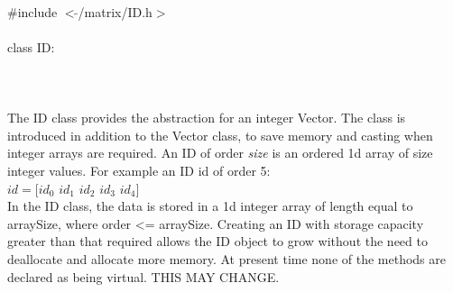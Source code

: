 
   \\
\indent \#include $<\tilde{ }$/matrix/ID.h$>$  \\

  \\
\indent class ID:  \\

 \\
 \\

  \\
\indent The ID class provides the abstraction for an integer Vector. 
The class is introduced in addition to the Vector class, to save memory
and casting when integer arrays are required. An ID of order {\em
size} is an ordered 1d array of \p size integer values. For example
an ID id of order 5:  \\

\indent\indent $id = [id_0$ $id_1$ $id_2$ $id_3$ $id_4]$ \\

In the ID class, the data is stored in a 1d integer array of length
equal to arraySize, where order <= arraySize. Creating an ID with
storage capacity greater than that required allows the ID object to
grow without the need to deallocate and allocate more memory. At
present time none of the methods are declared as being virtual. THIS
MAY CHANGE. \\

